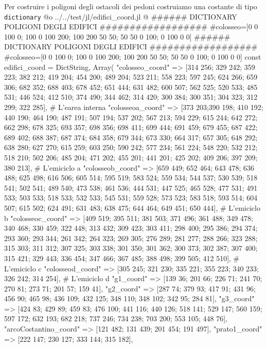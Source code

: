 \documentclass[]{article}
\begin{document}
Per costruire i poligoni degli ostacoli dei pedoni costruiamo una costante di tipo  {\tt dictionary} 
@o ../../test/jl/edifici_coord.jl @{
###### DICTIONARY POLIGONI DEGLI EDIFICI ##################
#colosseo=[0 0 100 0; 100 0 100 200; 100 200 50 50; 50 50 0 100; 0 100 0 0]
###### DICTIONARY POLIGONI DEGLI EDIFICI ##################
#colosseo=[0 0 100 0; 100 0 100 200; 100 200 50 50; 50 50 0 100; 0 100 0 0]
const edifici_coord = Dict{String, Array}(
"colosseo_coord" => [314 256; 329 242; 359 223; 382 212; 419 204; 454 200; 489 204; 523 211; 558 223; 597 245; 624 266; 659 306; 682 352; 688 403; 678 452;
651 444; 631 482; 600 507; 562 525; 520 533; 485 531; 446 524; 412 510; 374 490; 344 462; 314 420; 300 384; 300 351; 304 323; 312 299; 322 285], # L'earea interna
"colosseoa_coord" => [373 203;390 198; 410 192; 440 190; 464 190; 487 191; 507 194; 537 202; 567 213; 594 229; 615 244; 642 272; 662 298; 678 325; 693 357; 698 356;
698 411; 699 444; 691 459; 679 455; 687 422; 689 402; 688 387; 687 374; 684 358; 679 344; 673 330; 664 317; 657 305; 648 292; 638 280; 627 270; 615 259; 603 250;
590 242; 577 234; 561 224; 548 220; 532 212; 518 210; 502 206; 485 204; 471 202; 455 201; 441 201; 425 202; 409 206; 397 209; 380 213], # L'emiciclo a
"colosseob_coord" => [659 449; 652 464; 643 478; 636 488; 625 498; 616 506; 605 514; 595 519; 583 524; 559 534; 544 537; 530 539; 518 541; 502 541; 489 540; 473 538; 
461 536; 444 531; 447 525; 465 528; 477 531; 491 533; 503 533; 518 533; 532 533; 545 531; 559 528; 573 523; 583 518; 593 514; 604 507; 615 502; 624 491; 631 483;
638 475; 644 464; 649 451; 650 444], # L'emiciclo b
"colosseoc_coord" => [409 519; 395 511; 381 503; 371 496; 361 488; 349 478; 340 468; 330 459; 322 448; 313 432; 309 423; 303 411; 298 400; 295 386; 294 374;
293 360; 293 344; 261 342; 264 323; 269 305; 276 289; 281 277; 288 266; 323 288; 315 303; 311 312; 307 325; 303 338; 301 350; 301 362; 300 373; 302 387;
307 400; 315 421; 329 443; 336 454; 347 466; 367 485; 388 498; 399 505; 412 510], # L'emiciclo c
"colosseod_coord" => [305 245; 321 230; 335 221; 355 223; 340 233; 326 242; 314 254], # L'emiciclo d
"g1_coord" => [139 36; 201 66; 226 71; 241 70; 270 81; 273 71; 201 57; 159 41],
"g2_coord" => [287 74; 379 93; 417 91; 431 96; 456 90; 465 98; 436 109; 432 125; 348 110; 348 102; 342 95; 284 81],
"g3_coord" => [424 83; 429 89; 459 83; 476 100; 441 116; 440 126; 518 141; 529 147; 560 159; 597 172; 632 193; 682 218; 737 246; 734 238; 703 200; 553 105; 448 76],
"arcoCostantino_coord" => [121 482; 131 439; 201 454; 191 497],
"prato1_coord" => [222 147; 230 127; 333 144; 315 182],
}
\end{document}
